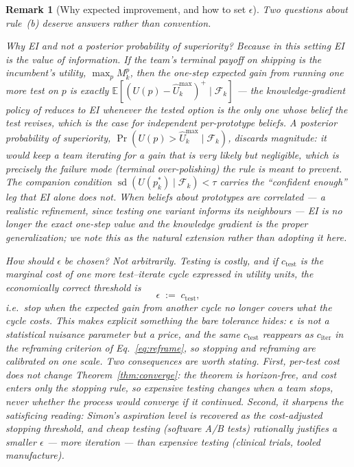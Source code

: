 \documentclass[11pt]{article}
\newtheorem{remark}{Remark}
\newcommand{\E}{\mathbb{E}}
\newcommand{\filt}{\mathcal{F}}     %
\begin{document}
\begin{remark}[Why expected improvement, and how to set $\epsilon$]
\label{rem:ei}
Two questions about rule~(b) deserve answers rather than convention.

\emph{Why EI and not a posterior probability of superiority?} Because in this setting EI \emph{is} the value of information. If the team's terminal payoff on shipping is the incumbent's utility, $\max_p M^p_k$, then the one-step expected gain from running one more test on $p$ is exactly $\E[(U(p)-\hat U_k^{\max})^{+}\mid\filt_k]$ --- the knowledge-gradient policy of \citet{frazier2008} reduces to EI whenever the tested option is the only one whose belief the test revises, which is the case for independent per-prototype beliefs. A posterior probability of superiority, $\Pr(U(p)>\hat U^{\max}_k\mid\filt_k)$, discards magnitude: it would keep a team iterating for a gain that is very likely but negligible, which is precisely the failure mode (terminal over-polishing) the rule is meant to prevent. The companion condition $\operatorname{sd}(U(p^*_k)\mid\filt_k)<\tau$ carries the ``confident enough'' leg that EI alone does not. When beliefs about prototypes are \emph{correlated} --- a realistic refinement, since testing one variant informs its neighbours --- EI is no longer the exact one-step value and the knowledge gradient is the proper generalization; we note this as the natural extension rather than adopting it here.

\emph{How should $\epsilon$ be chosen?} Not arbitrarily. Testing is costly, and if $c_{\text{test}}$ is the marginal cost of one more test--iterate cycle expressed in utility units, the economically correct threshold is
\begin{equation}
\label{eq:eps-cost}
\epsilon \;:=\; c_{\text{test}},
\end{equation}
i.e.\ stop when the expected gain from another cycle no longer covers what the cycle costs. This makes explicit something the bare tolerance hides: $\epsilon$ is not a statistical nuisance parameter but a \emph{price}, and the same $c_{\text{test}}$ reappears as $c_{\text{iter}}$ in the reframing criterion of Eq.~\eqref{eq:reframe}, so stopping and reframing are calibrated on one scale. Two consequences are worth stating. First, per-test cost does \emph{not} change Theorem~\ref{thm:converge}: the theorem is horizon-free, and cost enters only the stopping rule, so expensive testing changes \emph{when} a team stops, never \emph{whether} the process would converge if it continued. Second, it sharpens the satisficing reading: Simon's aspiration level is recovered as the cost-adjusted stopping threshold, and cheap testing (software A/B tests) rationally justifies a smaller $\epsilon$ --- more iteration --- than expensive testing (clinical trials, tooled manufacture).
\end{remark}
\end{document}
